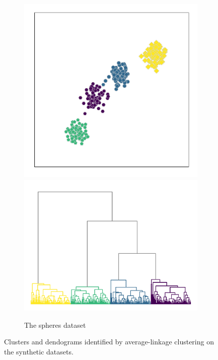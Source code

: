 \begin{figure}
    \begin{subfigure}{\textwidth}
        \centering
        \includegraphics[height=\hierheight]{hierarchical/spheres}
        \includegraphics[height=\hierheight]{dendogram/spheres}
        \caption{The spheres dataset}\label{fig:hierarchical_spheres}
    \end{subfigure}
    \caption{%
        Clusters and dendograms identified by average-linkage clustering on the
        synthetic datasets.%
    }\label{fig:hierarchical_examples}
\end{figure}

